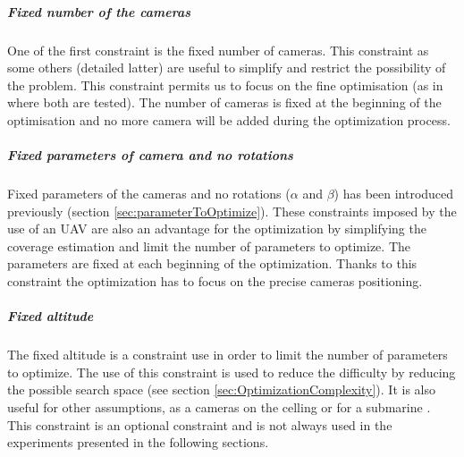 %
\subparagraph{Fixed number of the cameras}
One of the first constraint is the fixed number of cameras. This constraint as some others (detailed latter) are  useful to simplify and restrict the possibility of the problem. This constraint permits us to focus on the fine optimisation (as in \citep{22*zhao2008} where both are tested). The number of cameras is fixed at the beginning of the optimisation and no more camera will be added during the optimization process.  

\subparagraph{Fixed parameters of camera and no rotations}
Fixed parameters of the cameras and no rotations ($\alpha$ and $\beta$) has been introduced previously (section \ref{sec:parameterToOptimize}). These constraints imposed by the use of an UAV are also an advantage for the optimization by simplifying the coverage estimation and limit the number of parameters to optimize. The parameters are fixed at each beginning of the optimization. Thanks to this constraint the optimization  has to focus on the precise  cameras positioning.

\subparagraph{Fixed altitude}
 The fixed altitude is a constraint use in order to limit the number of parameters to optimize. The use of this constraint is used to reduce the difficulty by reducing the possible search space (see section \ref{sec:OptimizationComplexity}). It is also useful for other assumptions, as a cameras on the celling or for a submarine  \cite{66*galceran2013}. This constraint is an optional constraint and is not always used in the experiments presented in the following sections.   

